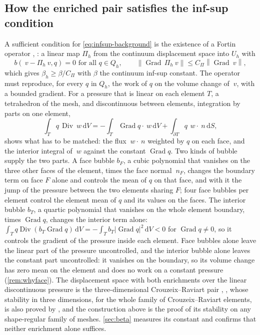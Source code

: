 \documentclass{article}
\newcommand{\Grad}{\operatorname{Grad}}
\newcommand{\Div}{\operatorname{Div}}
\newcommand{\norm}[1]{\left\lVert #1 \right\rVert}
\newcommand{\diff}{\,\mathrm{d}}
\theoremstyle{definition}
\theoremstyle{plain}
\begin{document}
\subsection{How the enriched pair satisfies the inf-sup condition}
\label{sec:fortin}

A sufficient condition for \eqref{eq:infsup-background} is the existence of
a Fortin operator \cite{Fortin:1977}, \cite[\S5.4]{BoffiBrezziFortin:2013}:
a linear map $\Pi_h$ from the continuum displacement space into $U_h$ with
\begin{equation}
  \label{eq:fortin}
  b(~v - \Pi_h ~v, q) = 0 \text{ for all } q \in Q_h,
  \qquad
  \norm{\Grad\, \Pi_h ~v} \le C_\Pi \norm{\Grad ~v} ,
\end{equation}
which gives $\beta_h \ge \beta / C_\Pi$ with $\beta$ the continuum inf-sup
constant. The operator must reproduce, for every $q$ in $Q_h$, the work of
$q$ on the volume change of $~v$, with a bounded gradient. For a pressure
that is linear on each element $T$, a tetrahedron of the mesh, and
discontinuous between elements,
integration by parts on one element,
\begin{equation}
  \label{eq:parts}
  \int_T q \, \Div ~w \diff V
  = - \int_T \Grad q \cdot ~w \diff V + \int_{\partial T} q \, ~w \cdot ~n \diff S ,
\end{equation}
shows what has to be matched: the flux $~w \cdot ~n$ weighted by $q$ on each
face, and the interior integral of $~w$ against the constant $\Grad q$.
Two kinds of bubble supply the two parts. A face bubble $b_F$, a cubic
polynomial that vanishes on the three other faces of the element, times the
face normal $~n_F$, changes the boundary term on face $F$ alone and controls
the mean of $q$ on that face, and with it the jump of the pressure between
the two elements sharing $F$; four face bubbles per element control the
element mean of $q$ and its values on the faces. The interior bubble $b_T$,
a quartic polynomial that vanishes on the whole element boundary, times
$\Grad q$, changes the interior term alone:
$\int_T q \Div(b_T \Grad q) \diff V = - \int_T b_T \lvert \Grad q \rvert^2
\diff V < 0$ for $\Grad q \ne 0$, so it controls the gradient of the
pressure inside each element. Face bubbles alone leave the linear part of
the pressure uncontrolled, and the interior bubble alone leaves the constant
part uncontrolled: it vanishes on the boundary, so its volume change has
zero mean on the element and does no work on a constant pressure
(\cref{rem:whyface}). The displacement space with both enrichments
over the linear discontinuous pressure is the three-dimensional
Crouzeix--Raviart pair \cite{CrouzeixRaviart:1973},
\cite[Example~8.7.2]{BoffiBrezziFortin:2013}, whose stability in three
dimensions, for the whole family of Crouzeix--Raviart elements, is also
proved by \textcite{SauterTorres:2022}, and the construction above is
the proof of its stability on any shape-regular family of meshes.
\cref{sec:beta} measures its constant and confirms that neither enrichment
alone suffices.
\end{document}
